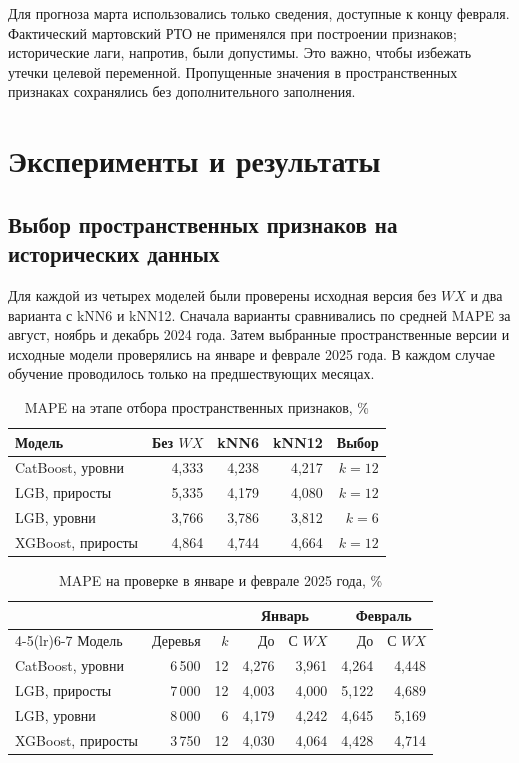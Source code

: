 \documentclass[12pt, a4paper]{article}
\newcommand{\tablesourcetext}[1]{\par\vspace{1mm}{\footnotesize Источник: #1.}}
\begin{document}
Для прогноза марта использовались только сведения, доступные к концу февраля.
Фактический мартовский РТО не применялся при построении признаков; исторические лаги, напротив, были допустимы.
Это важно, чтобы избежать утечки целевой переменной. Пропущенные значения в пространственных признаках сохранялись без дополнительного заполнения.

\section*{Эксперименты и результаты}

\subsection*{Выбор пространственных признаков на исторических данных}

Для каждой из четырех моделей были проверены исходная версия без $WX$ и два варианта с kNN6 и kNN12.
Сначала варианты сравнивались по средней MAPE за август, ноябрь и декабрь 2024 года.
Затем выбранные пространственные версии и исходные модели проверялись на январе и феврале 2025 года.
В каждом случае обучение проводилось только на предшествующих месяцах.

\begin{table}[H]
\centering
\footnotesize
\caption{MAPE на этапе отбора пространственных признаков, \%}
\begin{tabularx}{\textwidth}{Xrrrr}\toprule
Модель & Без $WX$ & kNN6 & kNN12 & Выбор\\\midrule
CatBoost, уровни & 4,333 & 4,238 & 4,217 & $k=12$ \\
LGB, приросты & 5,335 & 4,179 & 4,080 & $k=12$ \\
LGB, уровни & 3,766 & 3,786 & 3,812 & $k=6$ \\
XGBoost, приросты & 4,864 & 4,744 & 4,664 & $k=12$ \\
\bottomrule\end{tabularx}
\tablesourcetext{расчеты авторов по данным X5 Group и GeoNames}
\end{table}

\begin{table}[H]
\centering
\footnotesize
\setlength{\tabcolsep}{4pt}
\caption{MAPE на проверке в январе и феврале 2025 года, \%}
\begin{tabularx}{\textwidth}{Xrrrrrr}\toprule
& & & \multicolumn{2}{c}{Январь} & \multicolumn{2}{c}{Февраль}\\
\cmidrule(lr){4-5}\cmidrule(lr){6-7}
Модель & Деревья & $k$ & До & С $WX$ & До & С $WX$\\\midrule
CatBoost, уровни & 6\,500 & 12 & 4,276 & 3,961 & 4,264 & 4,448 \\
LGB, приросты & 7\,000 & 12 & 4,003 & 4,000 & 5,122 & 4,689 \\
LGB, уровни & 8\,000 & 6 & 4,179 & 4,242 & 4,645 & 5,169 \\
XGBoost, приросты & 3\,750 & 12 & 4,030 & 4,064 & 4,428 & 4,714 \\
\bottomrule\end{tabularx}
\tablesourcetext{расчеты авторов по данным X5 Group и GeoNames}
\end{table}
\end{document}
